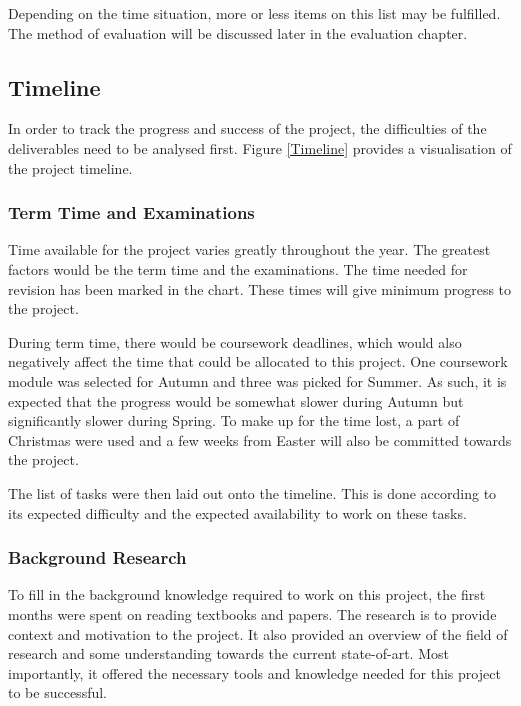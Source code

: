 Depending on the time situation, more or less items on this list may be
fulfilled.
The method of evaluation will be discussed later in the evaluation chapter.

\subsection{Timeline}
\begin{figure*}
  \centering
  
  \caption{Project Timeline}
  \label{Timeline}
\end{figure*}

In order to track the progress and success of the project, the difficulties
of the deliverables need to be analysed first.
Figure \ref{Timeline} provides a visualisation of the project timeline.

\subsubsection{\textbf{Term Time and Examinations}}
Time available for the project varies greatly throughout the year.
The greatest factors would be the term time and the examinations.
The time needed for revision has been marked in the chart.
These times will give minimum progress to the project.

During term time, there would be coursework deadlines, which would also
negatively affect the time that could be allocated to this project.
One coursework module was selected for Autumn and three was picked for Summer.
As such, it is expected that the progress would be somewhat slower during Autumn
but significantly slower during Spring.
To make up for the time lost, a part of Christmas were used and a few weeks
from Easter will also be committed towards the project.

The list of tasks were then laid out onto the timeline.
This is done according to its expected difficulty and the expected availability
to work on these tasks.

\subsubsection{\textbf{Background Research}}
To fill in the background knowledge required to work on this project, the first
months were spent on reading textbooks and papers.
The research is to provide context and motivation to the project.
It also provided an overview of the field of research and some understanding
towards the current state-of-art.
Most importantly, it offered the necessary tools and knowledge needed for this
project to be successful.

